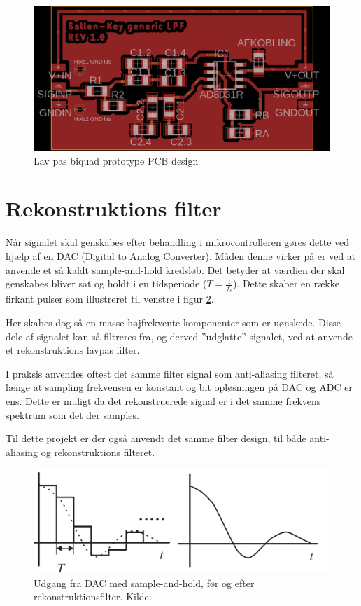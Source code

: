 \begin{figure}[H]
	\centering
	\includegraphics[width=.7\linewidth]{billeder/skbiquadpcb}
	\caption{Lav pas biquad prototype PCB design}
	\label{fig:skbiquadpcb}
\end{figure}

\section{Rekonstruktions filter}

Når signalet skal genskabes efter behandling i mikrocontrolleren gøres dette ved hjælp af en DAC (Digital to Analog Converter). 
Måden denne virker på er ved at anvende et så kaldt sample-and-hold kredsløb.
Det betyder at værdien der skal genskabes bliver sat og holdt i en
tidsperiode ($T=\frac{1}{f_s}$). Dette skaber en række firkant pulser som
illustreret til venstre i figur \ref{fig:samplholdrecon}.

Her skabes dog så en masse højfrekvente komponenter som er uønskede.
Disse dele af signalet kan så filtreres fra, og derved ''udglatte'' signalet, ved at anvende et rekonstruktions lavpas filter.

I praksis anvendes oftest det samme filter signal som anti-aliasing filteret,
så længe at sampling frekvensen er konstant og bit opløsningen på DAC og ADC
er ens. Dette er muligt da det rekonstruerede signal er i det samme frekvens
spektrum som det der samples.

Til dette projekt er der også anvendt det samme filter design, til både anti-aliasing og rekonstruktions filteret.

\begin{figure}[H]
	\centering
	\includegraphics[width=0.6\linewidth]{billeder/dacrecon}
	\caption{Udgang fra DAC med sample-and-hold, før og efter rekonstruktionsfilter. Kilde:\cite{Tan2013}}
	\label{fig:samplholdrecon}
\end{figure}
